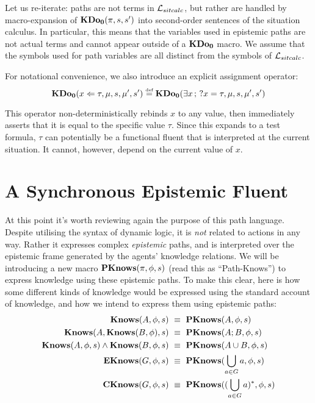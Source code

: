 Let us re-iterate: paths are not terms in $\mathcal{L}_{sitcalc}$, but rather are
handled by macro-expansion of $\mathbf{KDo_{0}}(\pi,s,s')$ into second-order
sentences of the situation calculus. In particular, this means that
the variables used in epistemic paths are not actual terms and cannot
appear outside of a $\mathbf{KDo_{0}}$ macro. We assume that the symbols used
for path variables are all distinct from the symbols of $\mathcal{L}_{sitcalc}$.

For notational convenience, we also introduce an explicit assignment
operator:\[
\mathbf{KDo_{0}}(x\Leftarrow\tau,\mu,s,\mu',s')\stackrel{\mbox{\tiny def}}{=}\mathbf{KDo_{0}}(\exists x\,;\,?x=\tau,\mu,s,\mu',s')\]


This operator non-deterministically rebinds $x$ to any value, then
immediately asserts that it is equal to the specific value $\tau$.
Since this expands to a test formula, $\tau$ can potentially be a
functional fluent that is interpreted at the current situation. It
cannot, however, depend on the current value of $x$.


\section{A Synchronous Epistemic Fluent\label{sec:CKnowledge:Synchronous}}

At this point it's worth reviewing again the purpose of this path
language. Despite utilising the syntax of dynamic logic, it is \emph{not}
related to actions in any way. Rather it expresses complex \emph{epistemic}
paths, and is interpreted over the epistemic frame generated by the
agents' knowledge relations. We will be introducing a new macro $\mathbf{PKnows}(\pi,\phi,s)$
(read this as {}``Path-Knows'') to express knowledge using these
epistemic paths. To make this clear, here is how some different kinds
of knowledge would be expressed using the standard account of knowledge,
and how we intend to express them using epistemic paths:\begin{align}
\mathbf{Knows}(A,\phi,s) & \,\,\equiv\,\,\mathbf{PKnows}(A,\phi,s)\nonumber \\
\mathbf{Knows}(A,\mathbf{Knows}(B,\phi),s) & \,\,\equiv\,\,\mathbf{PKnows}(A;B,\phi,s)\nonumber \\
\mathbf{Knows}(A,\phi,s)\wedge\mathbf{Knows}(B,\phi,s) & \,\,\equiv\,\,\mathbf{PKnows}(A\cup B,\phi,s)\nonumber \\
\mathbf{EKnows}(G,\phi,s) & \,\,\equiv\,\,\mathbf{PKnows}(\bigcup_{a\in G}a,\phi,s)\nonumber \\
\mathbf{CKnows}(G,\phi,s) & \,\,\equiv\,\,\mathbf{PKnows}((\bigcup_{a\in G}a)^{*},\phi,s)\label{eq:pknows_identities}\end{align}


